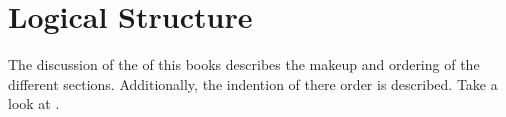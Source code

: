 \documentclass[crop=false,class=scrbook]{standalone}
\begin{document}
\chapter{Logical Structure}
The discussion of the  of this books describes the makeup and ordering
of the different sections.
Additionally, the indention of there order is described.
Take a look at .
\end{document}
